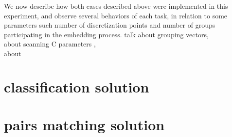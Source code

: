 We now describe how both cases described above were implemented in this experiment, and observe several behaviors of each task, in relation to some parameters such number of discretization points and number of groups participating in the embedding process.
talk about grouping vectors, \\
about scanning C parameters , \\
about 

\section{classification solution}
\section{pairs matching solution}
